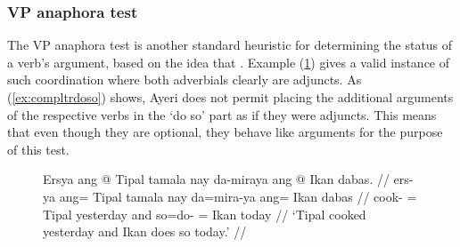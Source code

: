 \subsubsection{VP anaphora test}

The VP anaphora test is another standard heuristic for determining the status of a
verb's argument, based on the idea that
. Example (\ref{ex:dosovalid}) gives a valid
instance of such coordination where both adverbials clearly are adjuncts. As
(\ref{ex:compltrdoso}) shows, Ayeri does not permit placing the additional
arguments of the respective verbs in the `do so' part as if they were
adjuncts. This means that even though they are optional, they behave like
arguments for the purpose of this test.

\begin{figure}
\ex\label{ex:dosovalid}\begingl
	\gla Ersya ang @ Tipal tamala nay da-miraya ang @ Ikan dabas. //
	\glb ers-ya ang= Tipal tamala nay da=mira-ya ang= Ikan  dabas //
	\glc cook-\TsgM{} \Aarg{}= Tipal yesterday and so=do-\TsgM{} \Aarg{}=
		Ikan today //
	\glft `Tipal cooked yesterday and Ikan does so today.' //
\endgl\xe
\end{figure}

